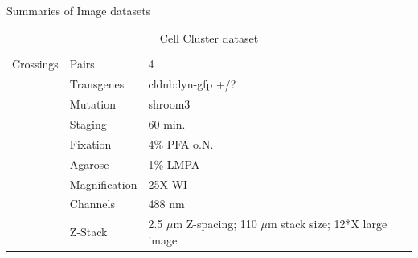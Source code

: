 \documentclass[11pt,singlespacinge,twoside]{reedthesis} %
\begin{document}
Summaries of Image datasets
\begin{table}[!h]

\caption{\label{tab:imgdatcc}Cell Cluster dataset}
\centering
\begin{tabu} to 
\toprule
{}  Crossings & Pairs & 4\\
 & Transgenes & cldnb:lyn-gfp +/?\\

   & Mutation & shroom3\\

 & Staging & 60 min.\\

   & Fixation & 4$\%$ PFA o.N.\\

 & Agarose & 1$\%$ LMPA\\

   & Magnification & 25X WI\\

 & Channels & 488 nm\\

   & Z-Stack & 2.5 $\mu$m Z-spacing; 110 $\mu$m stack size; 12*X large image\\
\bottomrule
\end{tabu}
\end{table}
\end{document}
